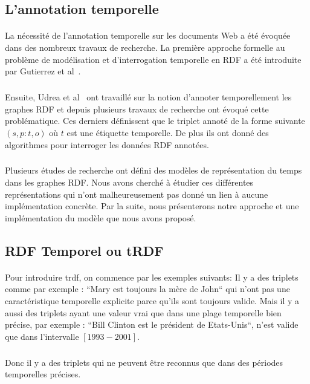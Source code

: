 \documentclass[12pt,a4]{report}
\begin{document}
\subsection{L'annotation temporelle}
\paragraph{}
La nécessité de l’annotation temporelle sur les documents Web a été évoquée dans des nombreux travaux de recherche. La première approche formelle au problème de modélisation et d’interrogation temporelle en RDF a été introduite par Gutierrez et al~\cite{gutierrez2005}.
\subparagraph{}
Ensuite, Udrea et al~\cite{udrea2006} ont travaillé sur la notion d'annoter temporellement les graphes RDF et depuis plusieurs travaux de recherche ont évoqué cette problématique.
Ces derniers définissent que le triplet annoté de la forme suivante $(s,p:t,o)$ où $t$ est une étiquette temporelle. De plus ils ont donné des algorithmes pour interroger les données RDF annotées.
\subparagraph{}	
Plusieurs études de recherche ont défini des modèles de représentation du temps dans les graphes RDF. Nous avons cherché à étudier ces différentes représentations qui n'ont malheureusement pas donné un lien à aucune implémentation concrète. Par la suite, nous présenterons notre approche et une implémentation du modèle que nous avons proposé.  
\subsection{RDF Temporel ou tRDF}
\paragraph{}
Pour introduire \gls{trdf}, on commence par les exemples suivants:
\newline
Il y a des triplets comme par exemple : ``Mary est toujours la mère de John`` qui n'ont pas une caractéristique temporelle explicite parce qu’ils sont toujours valide. Mais il y a aussi des triplets ayant une valeur vrai que dans une plage temporelle bien précise, par exemple : ``Bill Clinton est le président de Etats-Unis``, n'est valide que dans l'intervalle $[1993-2001]$.
\subparagraph{}
Donc il y a des triplets qui ne peuvent être reconnus que dans des périodes temporelles précises.
\end{document}

